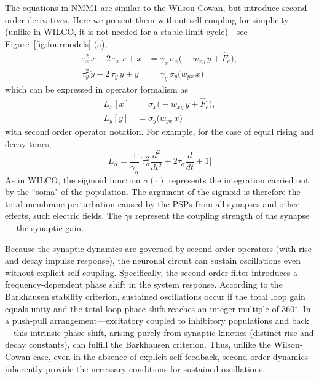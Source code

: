 \documentclass[12pt]{article}
\numberwithin{equation}{section}
\begin{document}
 
The equations in NMM1  are similar to the Wilson-Cowan, but introduce second-order derivatives. Here we present them without self-coupling for simplicity (unlike in WILCO, it is not needed for a stable limit cycle)---see Figure~\ref{fig:fourmodels} (a),
\begin{equation}
    \begin{aligned}
            \tau_x^{2}\,\ddot{x} + 2\,\tau_x\,\dot{x} +x
              &= \gamma_x\,\sigma_x\bigl(  - w_{xy}\,y + \hat F_e \bigr),\\
            \tau_y^{2}\,\ddot{y} + 2\,\tau_y\,\dot{y} +y
              &= \gamma_y\,\sigma_y\bigl(w_{yx}\,x  \bigr) 
          \end{aligned}
\end{equation}
which can be expressed in operator formalism as
\begin{equation} \label{eq:nmm1-simple}
    \begin{aligned}
            L_x[x]
              &= \sigma_x\bigl(  - w_{xy}\,y + \hat F_e \bigr),\\
           L_y[y] &= \sigma_y\bigl(w_{yx}\,x  \bigr) 
          \end{aligned}
\end{equation}
with second order operator notation. For example, for the case of equal rising and decay times, 
\begin{equation}\label{eq:L-operator-same-a}
L_\alpha = \frac{1}{\gamma_\alpha} \big [ \tau_\alpha^2 \frac{d^2}{dt^2} + 2 \tau_\alpha \frac{d}{dt} + 1 \big]
\end{equation}
As in WILCO, the sigmoid function $\sigma(\cdot)$ represents the integration carried out by the ``soma" of the population. The argument of the sigmoid is therefore the total membrane perturbation caused by the PSPs from all synapses and other effects, such electric fields.  The  $\gamma$s represent the coupling strength of the synapse --- the synaptic gain.  


Because the synaptic dynamics are governed by second-order operators (with rise and decay impulse response), the neuronal circuit can sustain oscillations even without explicit self-coupling. Specifically, the second-order filter introduces a frequency-dependent phase shift in the system response. According to the Barkhausen stability criterion, sustained oscillations occur if the total loop gain equals unity and the total loop phase shift reaches an integer multiple of 360$^\circ$. In a push-pull arrangement—excitatory coupled to inhibitory populations and back—this intrinsic phase shift, arising purely from synaptic kinetics (distinct rise and decay constants), can fulfill the Barkhausen criterion. Thus, unlike the Wilson-Cowan case,  even in the absence of explicit self-feedback, second-order dynamics inherently provide the necessary conditions for sustained oscillations.
\end{document}
